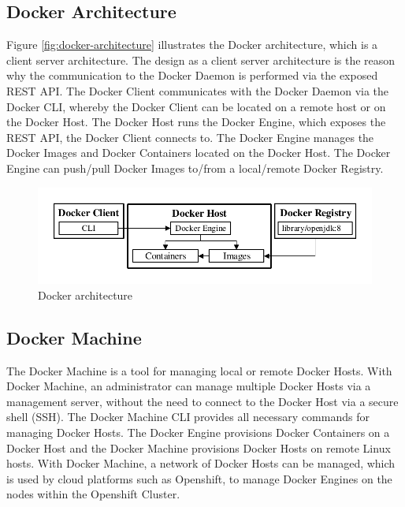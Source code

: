 \subsection{Docker Architecture}
\label{sec:docker-architecture}
Figure \vref{fig:docker-architecture} illustrates the Docker architecture, which is a client server architecture. The design as a client server architecture is the reason why the communication to the Docker Daemon is performed via the exposed REST API. The Docker Client communicates with the Docker Daemon via the Docker CLI, whereby the Docker Client can be located on a remote host or on the Docker Host. The Docker Host runs the Docker Engine, which exposes the REST API, the Docker Client connects to. The Docker Engine manages the Docker Images and Docker Containers located on the Docker Host. The Docker Engine can push/pull Docker Images to/from a local/remote Docker Registry.

\begin{figure}[htbp]
	\centering
	\includegraphics[scale=1]{images/docker-architecture.pdf}
	\caption{Docker architecture}
	\label{fig:docker-architecture}
\end{figure} 

\subsection{Docker Machine}
\label{sec:docker-machine}
The Docker Machine is a tool for managing local or remote Docker Hosts. With Docker Machine, an administrator can manage multiple Docker Hosts via a management server, without the need to connect to the Docker Host via a secure shell (SSH). The Docker Machine CLI provides all necessary commands for managing Docker Hosts. The Docker Engine provisions Docker Containers on a Docker Host and the Docker Machine provisions Docker Hosts on remote Linux hosts. With Docker Machine, a network of Docker Hosts can be managed, which is used by cloud platforms such as Openshift, to manage Docker Engines on the nodes within the Openshift Cluster\cite{DockerMachine2018}.  

